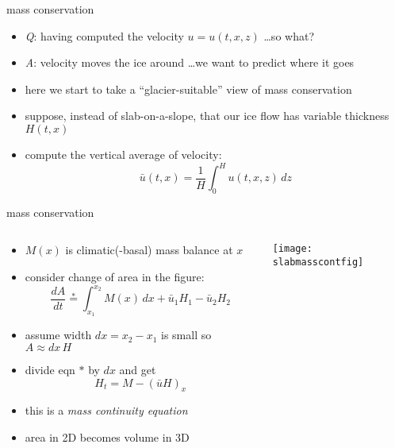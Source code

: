 \begin{frame}{mass conservation}

\begin{itemize}
\item \emph{Q}: having computed the velocity $u=u(t,x,z)$ \dots so what?
\item<2> \emph{A}: velocity moves the ice around \dots we want to predict where it goes 

\bigskip
\item<2> here we start to take \alert{a ``glacier-suitable'' view of mass conservation}
\item<2> suppose, instead of slab-on-a-slope, that our ice flow has variable thickness $H(t,x)$
\item<2> compute the vertical average of velocity:
	$$\bar u(t,x) = \frac{1}{H}\int_0^{H} u(t,x,z)\,dz$$
\end{itemize}
\end{frame}


\begin{frame}{mass conservation }

\begin{columns}
\begin{column}{0.6\textwidth}
\small
\begin{itemize}
\item $M(x)$ is climatic(-basal) mass balance at $x$
\item consider change of area in the figure:
	$$\frac{dA}{dt} \stackrel{\ast}{=} \int_{x_1}^{x_2} M(x)\,dx + \bar u_1 H_1 - \bar u_2 H_2$$
\item assume width $dx=x_2-x_1$ is small so $A\approx dx\, H$
\item divide eqn $\ast$ by $dx$ and get
   $$H_t = M - \left(\bar u H\right)_x$$
\item this is a \emph{mass continuity equation}
\item area in 2D becomes volume in 3D
\end{itemize}
\end{column}
\begin{column}{0.4\textwidth}
\texttt{[image: slabmasscontfig]}
\end{column}
\end{columns}

\end{frame}


